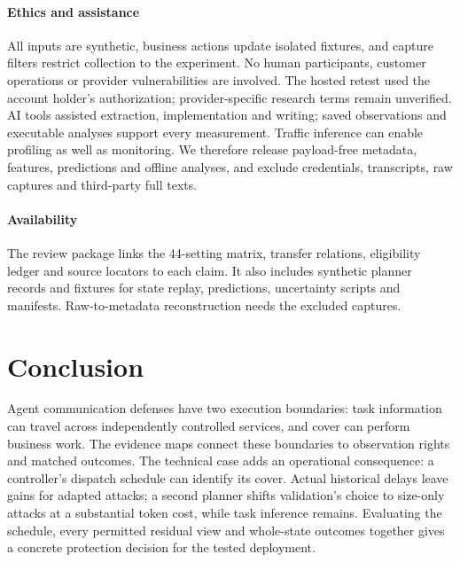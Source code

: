 \paragraph{Ethics and assistance}
All inputs are synthetic, business actions update isolated fixtures, and capture filters restrict collection to the experiment. No human participants, customer operations or provider vulnerabilities are involved. The hosted retest used the account holder's authorization; provider-specific research terms remain unverified. AI tools assisted extraction, implementation and writing; saved observations and executable analyses support every measurement. Traffic inference can enable profiling as well as monitoring. We therefore release payload-free metadata, features, predictions and offline analyses, and exclude credentials, transcripts, raw captures and third-party full texts.

\paragraph{Availability}
The review package links the 44-setting matrix, transfer relations, eligibility ledger and source locators to each claim. It also includes synthetic planner records and fixtures for state replay, predictions, uncertainty scripts and manifests. Raw-to-metadata reconstruction needs the excluded captures.

\section{Conclusion}
Agent communication defenses have two execution boundaries: task information can travel across independently controlled services, and cover can perform business work. The evidence maps connect these boundaries to observation rights and matched outcomes. The technical case adds an operational consequence: a controller's dispatch schedule can identify its cover. Actual historical delays leave gains for adapted attacks; a second planner shifts validation's choice to size-only attacks at a substantial token cost, while task inference remains. Evaluating the schedule, every permitted residual view and whole-state outcomes together gives a concrete protection decision for the tested deployment.
